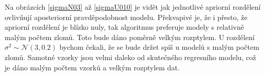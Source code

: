 \documentclass[czech,master,public,dept470,male,cpdeclaration,oneside, python]{diploma}
\begin{document}
Na obrázcích \ref{sigmaN03} až \ref{sigmaU010} je vidět jak jednotlivé apriorní rozdělení ovlivňují aposteriorní pravděpodobnost modelu. Překvapivé je, že i přesto, že apriorní rozdělení je blízko nuly, tak algoritmus preferuje modely s relativně malým počtem zlomů. Toto bude dáno poměrně velkým rozptylem. U rozdělení $\sigma^2 \sim \mathcal{N}(3, 0.2)$ bychom čekali, že se bude držet spíš u modelů s malým počtem zlomů. Samotné vzorky jsou velmi daleko od skutečného regresního modelu, což je dáno malým počtem vzorků a velkým rozptylem dat.
\end{document}
